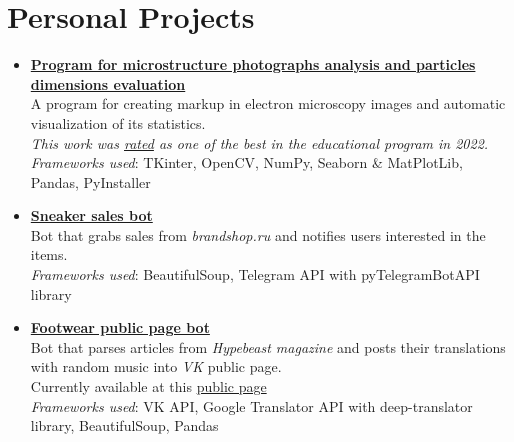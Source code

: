 \documentclass[11pt, a4paper]{article}
\begin{document}
\section*{Personal Projects}
\begin{itemize}
    \item \href{https://github.com/wwwwwert/structure_editor}
    {\textbf{Program for microstructure photographs analysis and particles dimensions evaluation}} \\
    \small {A program for creating markup in electron microscopy images and automatic visualization of its statistics. \\
    \textit{This work was \href{https://cs.hse.ru/cppr/best_projects}{rated} as one of the best in the educational program in 2022.}} \\
    {\footnotesize \textit{Frameworks used}: TKinter, OpenCV, NumPy, Seaborn \& MatPlotLib, Pandas, PyInstaller}

    \item \href{https://github.com/wwwwwert/sneaker_sales_bot}{\textbf{Sneaker sales bot}} \\
    \small {Bot that grabs sales from \textit{brandshop.ru} and notifies users interested in the items.} \\
    {\footnotesize \textit{Frameworks used}: BeautifulSoup, Telegram API with pyTelegramBotAPI library}

    \item \href{https://github.com/wwwwwert/footwear_page_bot}{\textbf{Footwear public page bot}} \\
    \small {Bot that parses articles from \textit{Hypebeast magazine} and posts their  translations with random music into \textit{VK} public page. \\
    Currently available at this \href{https://vk.com/footwear_damn}{public page}} \\
    {\footnotesize \textit{Frameworks used}: VK API, Google Translator API with deep-translator library, BeautifulSoup, Pandas}

\end{itemize}
\end{document}
